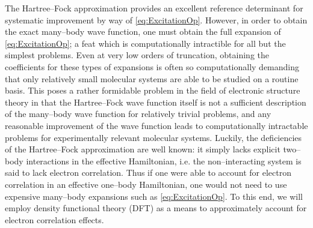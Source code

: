 The Hartree--Fock approximation provides an excellent reference determinant for systematic improvement
by way of \cref{eq:ExcitationOp}. However, in order to obtain the exact many--body wave function, one must
obtain the full expansion of \cref{eq:ExcitationOp}; a feat which is computationally intractible for all but
the simplest problems. Even at very low orders of truncation, obtaining the 
coefficients for these types of expansions is often so computationally demanding that only relatively
small molecular systems are able to be studied on a routine basis. This poses a rather formidable problem
in the field of electronic structure theory in that the Hartree--Fock wave function itself is not a sufficient
description of the many--body wave function for relatively trivial problems, and any reasonable improvement
of the wave function leads to computationally intractable problems for experimentally relevant molecular 
systems. Luckily, the deficiencies of the Hartree--Fock approximation are well known: it simply lacks
explicit two--body interactions in the effective Hamiltonian, i.e. the non--interacting system is said to
lack electron correlation. Thus if one were able to account for electron correlation 
 in an effective one--body Hamiltonian, one would not need to use expensive many--body expansions
such as \cref{eq:ExcitationOp}. To this end, we will employ density functional theory (DFT) as a means to approximately
account for electron correlation effects.

